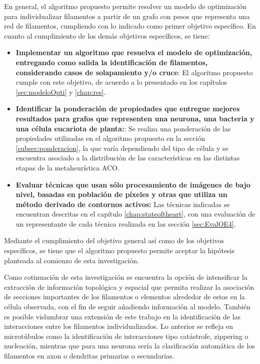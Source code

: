 En general, el algoritmo propuesto permite resolver un modelo de optimizaci\'on para individualizar filamentos a partir de un grafo con pesos que representa una red de filamentos, cumpliendo con lo indicado como primer objetivo espec\'ifico. En cuanto al cumplimiento de los dem\'as objetivos espec\'ificos, se tiene:
\begin{itemize}
    \item {\bf Implementar un algoritmo que resuelva el modelo de optimizaci\'on, entregando como salida la identificaci\'on de filamentos, considerando casos de solapamiento y/o cruce}: El algoritmo propuesto cumple con este objetivo, de acuerdo a lo presentado en los cap\'itulos \ref{sec:modeloOpti} y \ref{chap:res}.
    
    \item {\bf Identificar la ponderaci\'on de propiedades que entregue mejores resultados para grafos que representen una neurona, una bacteria y una c\'elula eucariota de planta:}: Se realiza una ponderaci\'on de las propiedades utilizadas en el algoritmo propuesto en la secci\'on \ref{subsec:ponderacion}, la que var\'ia dependiendo del tipo de c\'elula y se encuentra asociado a la distribuci\'on de las caracter\'isticas en las distintas etapas de la metaheur\'istica ACO.
    
    \item {\bf Evaluar t\'ecnicas que usan s\'olo procesamiento de im\'agenes de bajo nivel, basadas en poblaci\'on de p\'ixeles y otras que utiliza un m\'etodo derivado de contornos activos:} Las t\'ecnicas indicadas se encuentran descritas en el cap\'itulo \ref{chap:stateoftheart}, con una evaluaci\'on de un representante de cada t\'ecnica realizada en las secci\'on \ref{sec:EvalOE4}. %
\end{itemize}

Mediante el cumplimiento del objetivo general as\'i como de los objetivos espec\'ificos, se tiene que el algoritmo propuesto permite aceptar la hip\'otesis planteada al comienzo de esta investigaci\'on.

Como cotinuaci\'on de esta investigaci\'on se encuentra la opci\'on de intensificar la extracci\'on de informaci\'on topol\'ogica y espacial que permita realizar la asociaci\'on de secciones importantes de los filamentos o elementos alrededor de estos en la c\'elula observada, con el fin de seguir a\~nadiendo informaci\'on al modelo. Tambi\'en es posible vislumbrar una extensi\'on de este trabajo en la identificaci\'on de las interacciones entre los filamentos individualizados. Lo anterior se refleja en microt\'ubulos como la identificaci\'on de interacciones tipo cat\'astrofe, zippering o nucleaci\'on, mientras que para una neurona ser\'ia la clasificaci\'on autom\'atica de los filamentos en axon o dendritas primarias o secundarias.